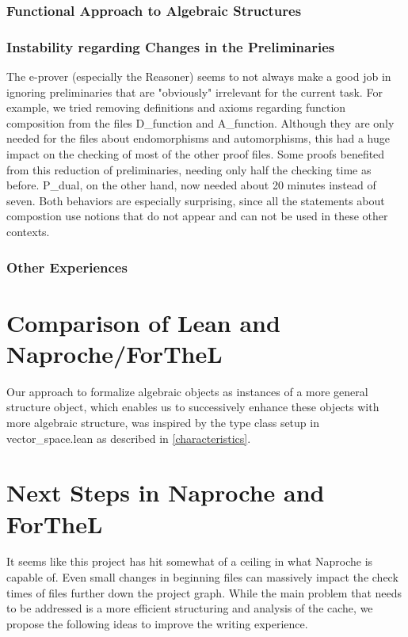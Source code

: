 \documentclass[11pt]{article}
\begin{document}
\subsubsection{Functional Approach to Algebraic Structures} \label{functionalapproach}

\subsubsection{Instability regarding Changes in the Preliminaries} \label{instabilites}
The e-prover (especially the Reasoner) seems to not always make a good job in ignoring preliminaries that are "obviously" irrelevant for the current task.
For example, we tried removing definitions and axioms regarding function composition from the files D\_function and A\_function. Although they are only needed for the files about endomorphisms and automorphisms, this had a huge impact on the checking of most of the other proof files.
Some proofs benefited from this reduction of preliminaries, needing only half the checking time as before.
P\_dual, on the other hand, now needed about 20 minutes instead of seven.
Both behaviors are especially surprising, since all the statements about compostion use notions that do not appear and can not be used in these other contexts.

\subsubsection{Other Experiences}


\newpage
\section{Comparison of Lean and Naproche/ForTheL}
Our approach to formalize algebraic objects as instances of a more general {\ftl structure} object, which enables us to successively enhance these objects with more algebraic structure, was inspired by the type class setup in vector\_space.lean as described in \ref{characteristics}.


\newpage 
\section{Next Steps in Naproche and ForTheL}

It seems like this project has hit somewhat of a ceiling in what Naproche is capable of. 
Even small changes in beginning files can massively impact the check times of files further down the project graph.
While the main problem that needs to be addressed is a more efficient structuring and analysis of the cache, we propose the following ideas to improve the writing experience.
\end{document}
